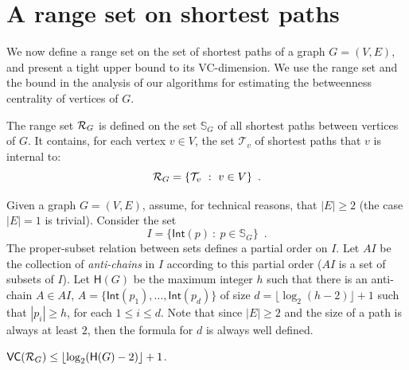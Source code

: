 \section{A range set on shortest paths}\label{sec:rangeset}
We now define a range set on the set of shortest paths of a graph $G=(V,E)$, and present 
a tight upper bound to its VC-dimension. We use the range set and the bound in
the analysis of our algorithms for estimating the betweenness centrality of
vertices of $G$.

The range set $\mathcal{R}_G$ is defined on the set $\mathbb{S}_G$ of all shortest
paths between vertices of $G$. It contains, for each vertex $v\in V$, the set
$\mathcal{T}_v$ of shortest paths that $v$ is internal to:
\[
\mathcal{R}_G = \{\mathcal{T}_v ~:~ v\in V\}\enspace.
\]

Given a graph $G=(V,E)$, assume, for technical reasons, that $|E|\ge 2$ (the
case $|E|=1$ is trivial). Consider the set 
\[
	I=\{\mathsf{Int}(p) ~:~ p\in\mathbb{S}_G\}\enspace.
\]
The proper-subset relation between sets defines a partial order on $I$. Let
$AI$ be the collection of \emph{anti-chains} in $I$ according to this partial
order ($AI$ is a set of subsets of $I$). Let $\mathsf{H}(G)$ be the maximum
integer $h$ such that there is an anti-chain $A\in AI$,
$A=\{\mathsf{Int}(p_1),\dotsc,\mathsf{Int}(p_d)\}$ of size
$d=\lfloor\log_2(h-2)\rfloor+1$ such that $|p_i|\ge h$, for each $1\le i\le d$. %
Note that since $|E|\ge 2$ and the size of a path is always at least $2$, then
the formula for $d$ is always well defined.



\begin{lemma}\label{lem:vcdimuppbound}
  $\mathsf{VC}(\mathcal{R}_G)\le\lfloor\log_2(\mathsf{H}(G)-2)\rfloor+1$.
\end{lemma}

